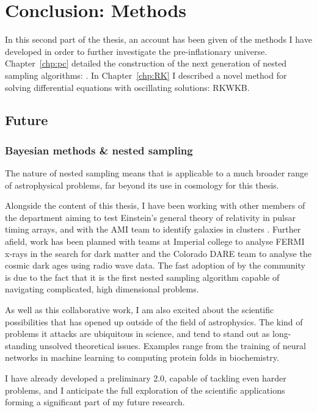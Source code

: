 \chapter*[Conclusion: Methods]{Conclusion: Methods}

In this second part of the thesis, an account has been given of the methods I have developed in order to further investigate the pre-inflationary universe. Chapter~\ref{chp:pc} detailed the construction of the next generation of nested sampling algorithms: \PolyChord{}. In Chapter~\ref{chp:RK} I described a novel method for solving differential equations with oscillating solutions: RKWKB\@.

\section*{Future}
\subsection*{Bayesian methods \& nested sampling}
The nature of nested sampling means that \PolyChord{} is applicable to a much broader range of astrophysical problems, far beyond its use in cosmology for this thesis. 

Alongside the content of this thesis, I have been working with other members of the department aiming to test Einstein's general theory of relativity in pulsar timing arrays, and with the AMI team to identify galaxies in clusters \citep{Rumsey}. Further afield, work has been planned with teams at Imperial college to analyse FERMI x-rays in the search for dark matter and the Colorado DARE team to analyse the cosmic dark ages using radio wave data. The fast adoption of \PolyChord{} by the community is due to the fact that it is the first nested sampling algorithm capable of navigating complicated, high dimensional problems.

As well as this collaborative work, I am also excited about the scientific possibilities that \PolyChord{} has opened up outside of the field of astrophysics. The kind of problems it attacks are ubiquitous in science, and tend to stand out as long-standing unsolved theoretical issues. Examples range from the training of neural networks in machine learning to computing protein folds in biochemistry.

I have already developed a preliminary \PolyChord{} 2.0, capable of tackling even harder problems, and I anticipate the full exploration of the scientific applications forming a significant part of my future research. 

